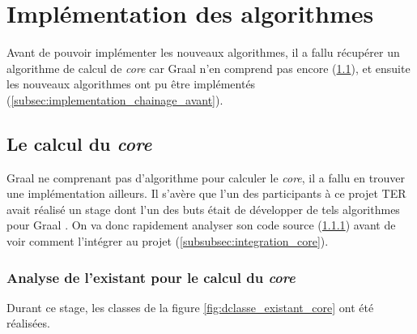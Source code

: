 \section{Implémentation des algorithmes}\label{sec:conception_implementation}

    Avant de pouvoir implémenter les nouveaux algorithmes, il a fallu récupérer un algorithme de calcul de \textit{core} car Graal n'en comprend pas encore (\ref{subsec:calcul_core}), et ensuite les nouveaux algorithmes ont pu être implémentés (\ref{subsec:implementation_chainage_avant}).
    
    \subsection{Le calcul du \textit{core}}\label{subsec:calcul_core}
     
     Graal ne comprenant pas d'algorithme pour calculer le \textit{core}, il a fallu en trouver une implémentation ailleurs. Il s'avère que l'un des participants à ce projet TER avait réalisé un stage dont l'un des buts était de développer de tels algorithmes pour Graal \cite{CORECHASE}. On va donc rapidement analyser son code source (\ref{subsubsec:analyse_existant_core}) avant de voir comment l'intégrer au projet (\ref{subsubsec:integration_core}).
    
    \subsubsection{Analyse de l'existant pour le calcul du \textit{core}}\label{subsubsec:analyse_existant_core}
    
     \par Durant ce stage, les classes de la figure \ref{fig:dclasse_existant_core} ont été réalisées.
     

